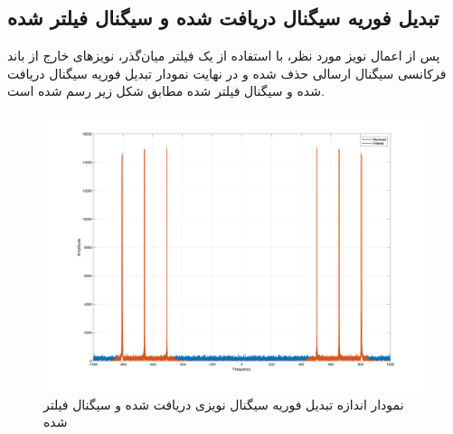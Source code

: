 \documentclass[10pt]{article}
\begin{document}
\subsection*{تبدیل فوریه سیگنال دریافت شده و سیگنال فیلتر شده}
پس از اعمال نویز مورد نظر، با استفاده از یک فیلتر میان‌گذر، نویز‌های خارج از باند فرکانسی سیگنال ارسالی حذف شده و در نهایت نمودار تبدیل فوریه سیگنال دریافت شده و سیگنال فیلتر شده مطابق شکل زیر رسم شده است.
\begin{figure}[h]
	\centering
	\includegraphics[width=0.95\linewidth]{../pics/q2-3}
	\caption{نمودار اندازه تبدیل فوریه سیگنال نویزی دریافت شده و سیگنال فیلتر شده }
	\label{fig:q2-3}
\end{figure}

\newpage
\end{document}
